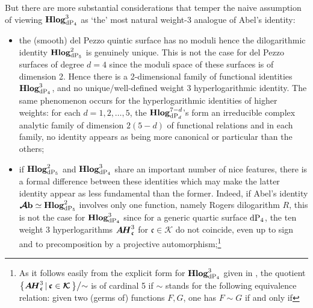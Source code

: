 \documentclass[11pt]{amsart}
\newcommand{\mk}{\medskip}
\begin{document}
But there are more substantial considerations that temper the naive assumption of viewing ${\bf Hlog}^{3}_{ {\rm dP}_4}$ as `the' most natural weight-3 analogue of Abel's identity:
\begin{itemize}%
\item[$-$]  the (smooth) del Pezzo quintic surface has no moduli 
hence the dilogarithmic identity ${\bf Hlog}^{2}_{ {\rm dP}_5}$ is genuinely unique. This is not the case for del Pezzo surfaces of degree $d=4$ since the moduli space of these surfaces is of dimension 2. Hence 
there is 
a 2-dimensional family of functional identities ${\bf Hlog}^{3}_{ {\rm dP}_4}$, and no unique/well-defined weight 3 hyperlogarithmic identity. 
The same phenomenon occurs for the hyperlogarithmic identities of higher weights: 
 for each 
 $d=1,2,\ldots,5$, 
 the  ${\bf Hlog}^{7-d}_{ {\rm dP}_{d}}$'s form an irreducible complex analytic family of dimension $2(5-d)$ of functional relations and in each family,  no identity appears as being more canonical or particular than the others;
 \mk
\item[$-$] if ${\bf Hlog}^{2}_{ {\rm dP}_5}$ and ${\bf Hlog}^{3}_{ {\rm dP}_4}$ share an important number of nice features, there is a formal difference between these identities which may make  the latter identity appear as less 
fundamental than the former. Indeed,  if Abel's identity 
$\boldsymbol{\mathcal A}{\bf b}\simeq 
{\bf Hlog}^{2}_{ {\rm dP}_5}$ involves only  one function, namely Rogers dilogarithm $R$, this is not the case for ${\bf Hlog}^{3}_{ {\rm dP}_4}$ since for a generic quartic surface $ {\rm dP}_4$, the ten weight 3 hyperlogarithms $\boldsymbol{A\hspace{-0.05cm}H}^3_{\boldsymbol{\mathfrak c}}$ for 
$\boldsymbol{\mathfrak c}\in \boldsymbol{\mathcal K}$ do not coincide, even up to sign and to precomposition by a projective automorphism;\footnote{As it follows easily from the explicit form for 
${\bf Hlog}^{3}_{ {\rm dP}_4}$ given in \cite[\S4]{CP}, the quotient 
$\big\{ \boldsymbol{A\hspace{-0.05cm}H}^3_{\boldsymbol{\mathfrak c}}
 \, \lvert 
 \,  \boldsymbol{\mathfrak c}\in \boldsymbol{\mathcal K} \, 
 \big\}   \big/ {\sim}$ 
is of cardinal 5 if $\sim$ stands for the following equivalence relation: given  two (germs of) functions $F,G$, one has $F\sim G$ if and only if 
}
\end{itemize}
\end{document}
